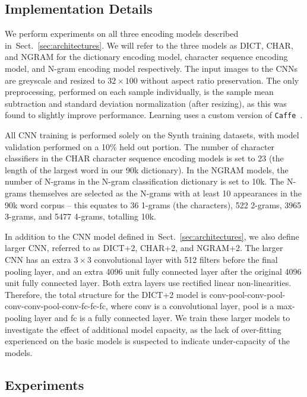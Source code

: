 \documentclass{article} \usepackage{nips14submit_e,times}
\newcommand{\sref}[1]{Sect.~\ref{#1}}
\begin{document}
\subsection{Implementation Details}\label{sec:implementation}
We perform experiments on all three encoding models described in~\sref{sec:architectures}. We will refer to the three models as DICT, CHAR, and NGRAM for the dictionary encoding model, character sequence encoding model, and N-gram encoding model respectively. The input images to the CNNs are greyscale and resized to $32 \times 100$ without aspect ratio preservation. 
The only preprocessing, performed on each sample individually, is the sample mean subtraction and standard deviation normalization (after resizing), as this was found to slightly improve performance.
Learning uses a custom version of \texttt{Caffe}~\cite{Jia13}.

All CNN training is performed solely on the Synth training datasets, with model validation performed on a 10\% held out portion. The number of character classifiers in the CHAR character sequence encoding models is set to 23 (the length of the largest word in our 90k dictionary). In the NGRAM models, the number of N-grams in the N-gram classification dictionary is set to 10k. The N-grams themselves are selected as the N-grams with at least 10 appearances in the 90k word corpus -- this equates to 36 1-grams (the characters), 522 2-grams, 3965 3-grams, and 5477 4-grams, totalling 10k.

In addition to the CNN model defined in~\sref{sec:architectures}, we also define larger CNN, referred to as DICT+2, CHAR+2, and NGRAM+2. The larger CNN has an extra $3 \times 3$ convolutional layer with 512 filters before the final pooling layer, and an extra 4096 unit fully connected layer after the original 4096 unit fully connected layer. Both extra layers use rectified linear non-linearities. Therefore, the total structure for the DICT+2 model is conv-pool-conv-pool-conv-conv-pool-conv-fc-fc-fc, where conv is a convolutional layer, pool is a max-pooling layer and fc is a fully connected layer. We train these larger models to investigate the effect of additional model capacity, as the lack of over-fitting experienced on the basic models is suspected to indicate under-capacity of the models.

\subsection{Experiments}\label{sec:experiments}
\end{document}
